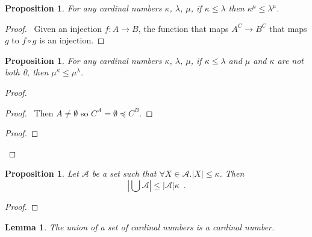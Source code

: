 \documentclass{book}
\let\qed\relax
\newtheorem{prop}[ax]{Proposition}
\newtheorem{lm}[ax]{Lemma}
\theoremstyle{definition}
\begin{document}
\begin{prop}
For any cardinal numbers $\kappa$, $\lambda$, $\mu$, if $\kappa \leq \lambda$ then $\kappa^\mu \leq \lambda^\mu$.
\end{prop}

\begin{proof}
\pf\ Given an injection $f : A \rightarrow B$, the function that maps $A^C \rightarrow B^C$ that maps $g$ to $f \circ g$ is an injection. \qed
\end{proof}

\begin{prop}
For any cardinal numbers $\kappa$, $\lambda$, $\mu$, if $\kappa \leq \lambda$ and $\mu$ and $\kappa$ are not both 0, then $\mu^\kappa \leq \mu^\lambda$.
\end{prop}

\begin{proof}
\pf
{}
\begin{proof}
	\pf\ Then $A \neq \emptyset$ so $C^A = \emptyset \preccurlyeq C^B$.
\end{proof}
\begin{proof}
\end{proof}
\qed
\end{proof}

\begin{prop}
\label{prop:unioncard}
Let $\mathcal{A}$ be a set such that $\forall X \in \mathcal{A}. |X| \leq \kappa$. Then
\[ \left| \bigcup \mathcal{A} \right| \leq |\mathcal{A}| \kappa \enspace . \]
\end{prop}

\begin{proof}
\pf
{}
\qed
\end{proof}

\begin{lm}
\label{lm:supcard}
The union of a set of cardinal numbers is a cardinal number.
\end{lm}
\end{document}
